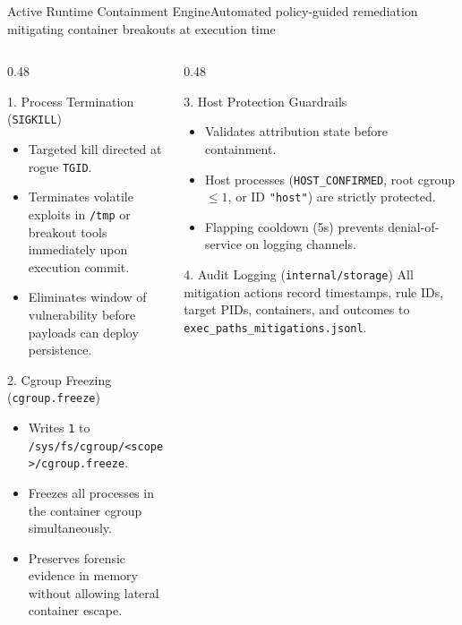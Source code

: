 \documentclass[aspectratio=169,10pt]{beamer}
\begin{document}
\begin{frame}{Active Runtime Containment Engine}{Automated policy-guided remediation mitigating container breakouts at execution time}
  \begin{columns}[T]
    \begin{column}{0.48\textwidth}
      \begin{alertblock}{1. Process Termination (\texttt{SIGKILL})}
        \scriptsize
        \begin{itemize}
          \item Targeted kill directed at rogue \texttt{TGID}.
          \item Terminates volatile exploits in \texttt{/tmp} or breakout tools immediately upon execution commit.
          \item Eliminates window of vulnerability before payloads can deploy persistence.
        \end{itemize}
      \end{alertblock}

      \begin{block}{2. Cgroup Freezing (\texttt{cgroup.freeze})}
        \scriptsize
        \begin{itemize}
          \item Writes \texttt{1} to \texttt{/sys/fs/cgroup/<scope>/cgroup.freeze}.
          \item Freezes all processes in the container cgroup simultaneously.
          \item Preserves forensic evidence in memory without allowing lateral container escape.
        \end{itemize}
      \end{block}
    \end{column}

    \begin{column}{0.48\textwidth}
      \begin{exampleblock}{3. Host Protection Guardrails}
        \scriptsize
        \begin{itemize}
          \item Validates attribution state before containment.
          \item Host processes (\texttt{HOST\_CONFIRMED}, root cgroup $\le 1$, or ID \texttt{"host"}) are strictly protected.
          \item Flapping cooldown (5s) prevents denial-of-service on logging channels.
        \end{itemize}
      \end{exampleblock}

      \begin{block}{4. Audit Logging (\texttt{internal/storage})}
        \scriptsize
        All mitigation actions record timestamps, rule IDs, target PIDs, containers, and outcomes to \texttt{exec\_paths\_mitigations.jsonl}.
      \end{block}
    \end{column}
  \end{columns}
\end{frame}
\end{document}
